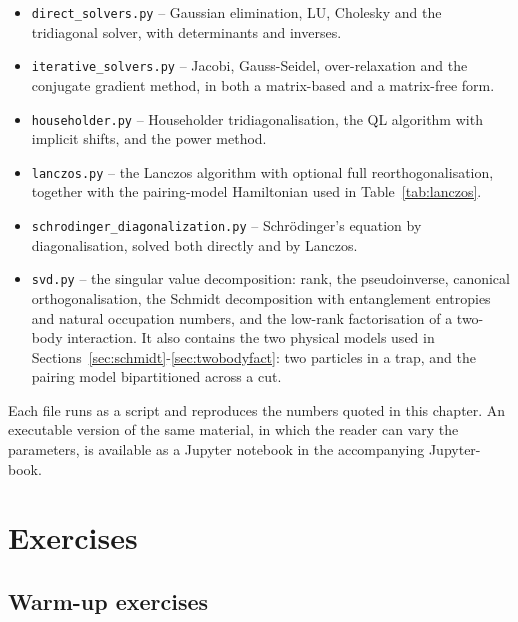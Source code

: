 \begin{itemize}
  \item \texttt{direct\_solvers.py} -- Gaussian elimination, LU, Cholesky and
        the tridiagonal solver, with determinants and inverses.
  \item \texttt{iterative\_solvers.py} -- Jacobi, Gauss-Seidel,
        over-relaxation and the conjugate gradient method, in both a
        matrix-based and a matrix-free form.
  \item \texttt{householder.py} -- Householder tridiagonalisation, the QL
        algorithm with implicit shifts, and the power method.
  \item \texttt{lanczos.py} -- the Lanczos algorithm with optional full
        reorthogonalisation, together with the pairing-model Hamiltonian used
        in Table~\ref{tab:lanczos}.
  \item \texttt{schrodinger\_diagonalization.py} -- Schr\"odinger's equation
        by diagonalisation, solved both directly and by Lanczos.
  \item \texttt{svd.py} -- the singular value decomposition: rank, the
        pseudoinverse, canonical orthogonalisation, the Schmidt decomposition
        with entanglement entropies and natural occupation numbers, and the
        low-rank factorisation of a two-body interaction.  It also contains
        the two physical models used in
        Sections~\ref{sec:schmidt}-\ref{sec:twobodyfact}: two particles in a
        trap, and the pairing model bipartitioned across a cut.
\end{itemize}

Each file runs as a script and reproduces the numbers quoted in this chapter.
An executable version of the same material, in which the reader can vary the
parameters, is available as a Jupyter notebook in the accompanying
Jupyter-book.





\section{Exercises}
\label{sec:exercises}

\subsection*{Warm-up exercises}

